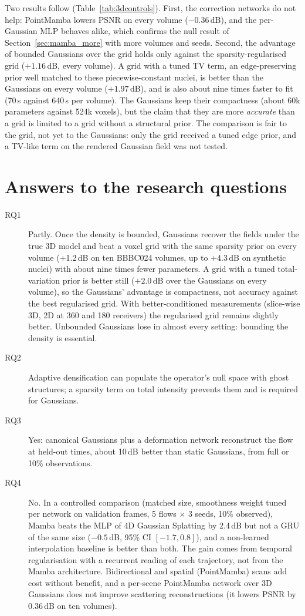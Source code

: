 Two results follow (Table~\ref{tab:3dcontrols}). First, the correction networks do not help: PointMamba lowers PSNR
on every volume ($-0.36$\,dB), and the per-Gaussian MLP behaves alike, which confirms the null result of
Section~\ref{sec:mamba_more} with more volumes and seeds. Second, the advantage of bounded Gaussians over the grid holds
only against the sparsity-regularised grid ($+1.16$\,dB, every volume). A grid with a tuned TV term, an edge-preserving
prior well matched to these piecewise-constant nuclei, is better than the Gaussians on every volume ($+1.97$\,dB), and is
also about nine times faster to fit (70\,s against 640\,s per volume). The Gaussians keep their compactness (about 60k
parameters against 524k voxels), but the claim that they are more \emph{accurate} than a grid is limited to a grid
without a structural prior. The comparison is fair to the grid, not yet to the Gaussians: only the grid received a
tuned edge prior, and a TV-like term on the rendered Gaussian field was not tested.

\FloatBarrier
\section{Answers to the research questions}
\begin{description}
  \item[RQ1] Partly. Once the density is bounded, Gaussians recover the fields under the true 3D model and beat a
  voxel grid with the same sparsity prior on every volume (+1.2\,dB on ten BBBC024 volumes, up to +4.3\,dB on
  synthetic nuclei) with about nine times fewer parameters. A grid with a tuned total-variation prior is better
  still ($+2.0$\,dB over the Gaussians on every volume), so the Gaussians' advantage is compactness, not accuracy
  against the best regularised grid. With better-conditioned
  measurements (slice-wise 3D, 2D at 360 and 180 receivers) the regularised grid remains slightly better.
  Unbounded Gaussians lose in almost every setting: bounding the density is essential.
  \item[RQ2] Adaptive densification can populate the operator's null space with ghost structures; a sparsity term on
  total intensity prevents them and is required for Gaussians.
  \item[RQ3] Yes: canonical Gaussians plus a deformation network reconstruct the flow at held-out times, about 10\,dB
  better than static Gaussians, from full or 10\% observations.
  \item[RQ4] No. In a controlled comparison (matched size, smoothness weight tuned per network on validation frames,
  5 flows $\times$ 3 seeds, 10\% observed), Mamba beats the MLP of 4D Gaussian Splatting by 2.4\,dB but not a GRU of
  the same size ($-0.5$\,dB, 95\% CI $[-1.7, 0.8]$), and a non-learned interpolation baseline is better than both. The
  gain comes from temporal regularisation with a recurrent reading of each trajectory, not from the Mamba
  architecture. Bidirectional and spatial (PointMamba) scans add cost without benefit, and a per-scene PointMamba
  network over 3D Gaussians does not improve scattering reconstructions (it lowers PSNR by 0.36\,dB on ten volumes).
\end{description}
